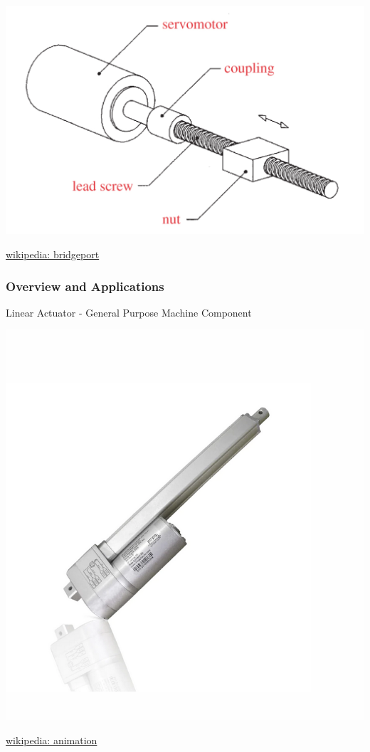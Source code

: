 \documentclass[fleqn]{beamer} %
\newcommand{\sectiontitleI}{Overview and Applications}
\begin{document}
\begin{frame}[label=sectionI]
\begin{multicols}{2}
			\includegraphics[scale=0.1]{images/figure_15_5.png}
		
		\end{multicols}

		\href{https://en.wikipedia.org/wiki/Bridgeport_(machine_tool_brand)\#/media/File:Sharp_3_Axis_Vertical_Mill_Full_View.jpg}{wikipedia: bridgeport}
	
	\end{frame}

	\begin{frame}[label=sectionI] \small
		\frametitle{\sectiontitleI}	
		Linear Actuator - General Purpose Machine Component

		\includegraphics[scale=0.2]{images/fergelli_optical_feedback_actuator.png}

		\href{https://en.wikipedia.org/wiki/Linear_actuator\#/media/File:Linear_actuator_basic.gif}{wikipedia: animation}

	\end{frame}
\end{document}

